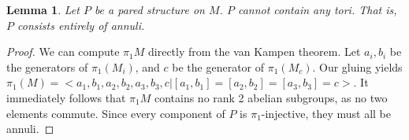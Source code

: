 \documentclass[12pt]{amsart}
\newtheorem{lemma}[theorem]{Lemma}
\theoremstyle{definition}
\begin{document}
\begin{lemma}

Let $P$ be a pared structure on $M$. $P$ cannot contain any tori. That is,
$P$ consists entirely of annuli.

\end{lemma}
\begin{proof}

We can compute $\pi_1M$ directly from the van Kampen theorem. Let $a_i,b_i$ be
the generators of $\pi_1(M_i)$, and $c$ be the generator of $\pi_1(M_c)$. Our
gluing yields $\pi_1(M) = <a_1,b_1,a_2,b_2,a_3,b_3,c|
[a_1,b_1]=[a_2,b_2]=[a_3,b_3]=c>$. It immediately follows that $\pi_1M$
contains no rank 2 abelian subgroups, as no two elements commute. Since every
component of $P$ is $\pi_1$-injective, they must all be annuli.

\end{proof}
\end{document}
